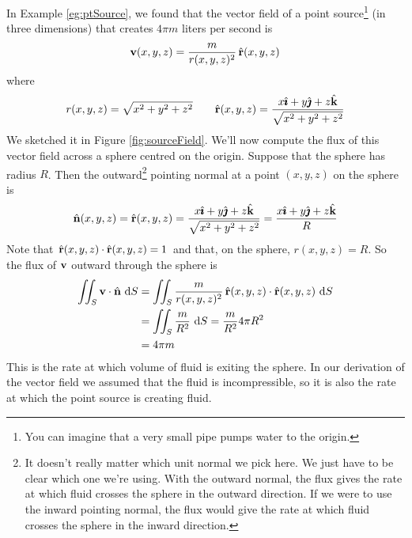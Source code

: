 \begin{eg}\label{eg:fluxIntegralA}
In Example \ref{eg:ptSource}, we found that the vector field of
a point source\footnote{You can imagine that a very small pipe pumps water to
the origin.} (in three dimensions) that creates $4\pi m$ liters per second 
is
\begin{equation*}
\mathbf{v}(x,y,z) = \frac{m}{r(x,y,z)^2}\,\hat{\mathbf{r}}(x,y,z)
\end{equation*}
where
\begin{equation*}
r(x,y,z) = \sqrt{x^2+y^2+z^2}\qquad
\hat{\mathbf{r}}(x,y,z) = \frac{x\hat{\pmb{\imath}} + y\hat{\pmb{\jmath}} + z\hat{\mathbf{k}}}{\sqrt{x^2+y^2+z^2}}
\end{equation*}
We sketched it in Figure \ref{fig:sourceField}.
We'll now compute the flux of this vector field across a
sphere centred on the origin. Suppose that the sphere has radius $R$.
Then the outward\footnote{It doesn't really matter which unit normal we pick here. We just have to be clear which one we're using. With the outward normal,
the flux gives the rate at which fluid crosses the sphere in the outward 
direction. If we were to use the inward pointing normal, the flux 
would give the rate at which fluid crosses the sphere in the inward 
direction.
} pointing normal at a point $(x,y,z)$ on the sphere is
\begin{equation*}
\hat{\mathbf{n}}(x,y,z) = \hat{\mathbf{r}}(x,y,z) = \frac{x\hat{\pmb{\imath}} + y\hat{\pmb{\jmath}} + z\hat{\mathbf{k}}}{\sqrt{x^2+y^2+z^2}}
= \frac{x\hat{\pmb{\imath}} + y\hat{\pmb{\jmath}} + z\hat{\mathbf{k}}}{R}
\end{equation*}
Note that $\hat{\mathbf{r}}(x,y,z)\cdot \hat{\mathbf{r}}(x,y,z)=1$ and that, on the sphere,
$r(x,y,z)=R$.
So the flux of $\mathbf{v}$ outward through the sphere is
\begin{align*}
 \iint_S\mathbf{v}\cdot\hat{\mathbf{n}}\ \mathrm{d}S
&= \iint_S \frac{m}{r(x,y,z)^2}\,\hat{\mathbf{r}}(x,y,z) \cdot \hat{\mathbf{r}}(x,y,z)\ \mathrm{d}S
\\
&= \iint_S \frac{m}{R^2}\ \mathrm{d}S
=\frac{m}{R^2} 4\pi R^2
\\
&=4\pi m
\end{align*}
This is the rate at which volume of fluid is exiting the sphere.
In our derivation of the vector field we assumed that the fluid is
incompressible, so it is also the rate at which the point source is 
creating fluid.

\end{eg}


